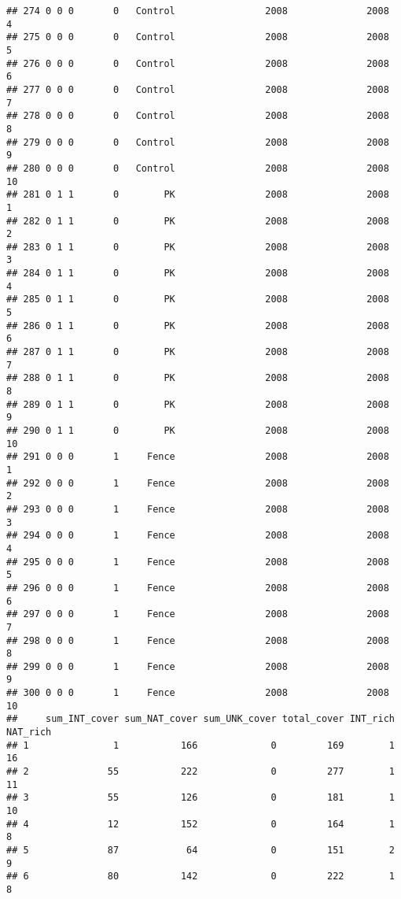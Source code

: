 \documentclass[]{article}
\begin{document}
\begin{verbatim}
## 274 0 0 0       0   Control                2008              2008        4
## 275 0 0 0       0   Control                2008              2008        5
## 276 0 0 0       0   Control                2008              2008        6
## 277 0 0 0       0   Control                2008              2008        7
## 278 0 0 0       0   Control                2008              2008        8
## 279 0 0 0       0   Control                2008              2008        9
## 280 0 0 0       0   Control                2008              2008       10
## 281 0 1 1       0        PK                2008              2008        1
## 282 0 1 1       0        PK                2008              2008        2
## 283 0 1 1       0        PK                2008              2008        3
## 284 0 1 1       0        PK                2008              2008        4
## 285 0 1 1       0        PK                2008              2008        5
## 286 0 1 1       0        PK                2008              2008        6
## 287 0 1 1       0        PK                2008              2008        7
## 288 0 1 1       0        PK                2008              2008        8
## 289 0 1 1       0        PK                2008              2008        9
## 290 0 1 1       0        PK                2008              2008       10
## 291 0 0 0       1     Fence                2008              2008        1
## 292 0 0 0       1     Fence                2008              2008        2
## 293 0 0 0       1     Fence                2008              2008        3
## 294 0 0 0       1     Fence                2008              2008        4
## 295 0 0 0       1     Fence                2008              2008        5
## 296 0 0 0       1     Fence                2008              2008        6
## 297 0 0 0       1     Fence                2008              2008        7
## 298 0 0 0       1     Fence                2008              2008        8
## 299 0 0 0       1     Fence                2008              2008        9
## 300 0 0 0       1     Fence                2008              2008       10
##     sum_INT_cover sum_NAT_cover sum_UNK_cover total_cover INT_rich NAT_rich
## 1               1           166             0         169        1       16
## 2              55           222             0         277        1       11
## 3              55           126             0         181        1       10
## 4              12           152             0         164        1        8
## 5              87            64             0         151        2        9
## 6              80           142             0         222        1        8

\end{verbatim}
\end{document}
